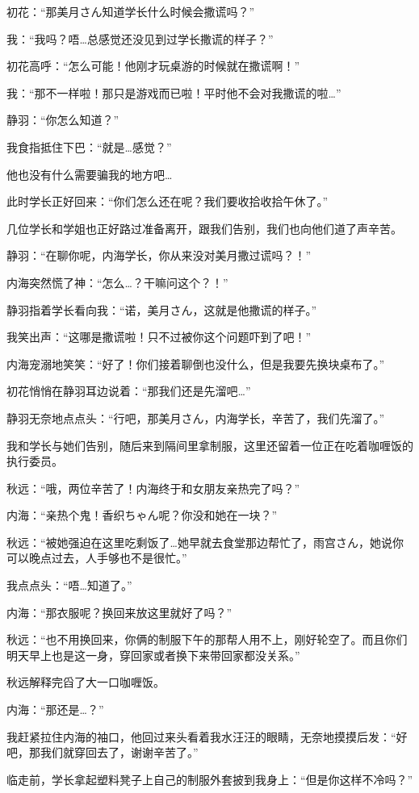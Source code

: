 初花：“那美月さん知道学长什么时候会撒谎吗？”

我：“我吗？唔…总感觉还没见到过学长撒谎的样子？”

初花高呼：“怎么可能！他刚才玩桌游的时候就在撒谎啊！”

我：“那不一样啦！那只是游戏而已啦！平时他不会对我撒谎的啦…”

静羽：“你怎么知道？”

我食指抵住下巴：“就是…感觉？”

他也没有什么需要骗我的地方吧…

此时学长正好回来：“你们怎么还在呢？我们要收拾收拾午休了。”

几位学长和学姐也正好路过准备离开，跟我们告别，我们也向他们道了声辛苦。

静羽：“在聊你呢，内海学长，你从来没对美月撒过谎吗？！”

内海突然慌了神：“怎么…？干嘛问这个？！”

静羽指着学长看向我：“诺，美月さん，这就是他撒谎的样子。”

我笑出声：“这哪是撒谎啦！只不过被你这个问题吓到了吧！”

内海宠溺地笑笑：“好了！你们接着聊倒也没什么，但是我要先换块桌布了。”

初花悄悄在静羽耳边说着：“那我们还是先溜吧…”

静羽无奈地点点头：“行吧，那美月さん，内海学长，辛苦了，我们先溜了。”

我和学长与她们告别，随后来到隔间里拿制服，这里还留着一位正在吃着咖喱饭的执行委员。

秋远：“哦，两位辛苦了！内海终于和女朋友亲热完了吗？”

内海：“亲热个鬼！香织ちゃん呢？你没和她在一块？”

秋远：“被她强迫在这里吃剩饭了…她早就去食堂那边帮忙了，雨宫さん，她说你可以晚点过去，人手够也不是很忙。”

我点点头：“唔…知道了。”

内海：“那衣服呢？换回来放这里就好了吗？”

秋远：“也不用换回来，你俩的制服下午的那帮人用不上，刚好轮空了。而且你们明天早上也是这一身，穿回家或者换下来带回家都没关系。”

秋远解释完舀了大一口咖喱饭。

内海：“那还是…？”

我赶紧拉住内海的袖口，他回过来头看着我水汪汪的眼睛，无奈地摸摸后发：“好吧，那我们就穿回去了，谢谢辛苦了。”

临走前，学长拿起塑料凳子上自己的制服外套披到我身上：“但是你这样不冷吗？”

